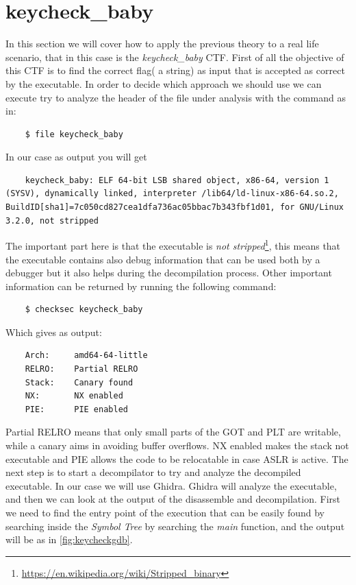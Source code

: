 \documentclass{article}
\begin{document}
\section{keycheck\_baby}
In this section we will cover how to apply the previous theory to a real life scenario, that in this case is the \textit{keycheck\_baby} CTF.
First of all the objective of this CTF is to find the correct flag( a string) as input that is accepted as correct by the executable.
In order to decide which approach we should use we can execute try to analyze the header of the file under analysis with the command as in:
\begin{verbatim}
    $ file keycheck_baby
\end{verbatim}
In our case as output you will get
\begin{verbatim}
    keycheck_baby: ELF 64-bit LSB shared object, x86-64, version 1 (SYSV), dynamically linked, interpreter /lib64/ld-linux-x86-64.so.2, BuildID[sha1]=7c050cd827cea1dfa736ac05bbac7b343fbf1d01, for GNU/Linux 3.2.0, not stripped
\end{verbatim}
The important part here is that the executable is \textit{not stripped}\footnote{\url{https://en.wikipedia.org/wiki/Stripped_binary}}, this means that the executable contains also debug information that can be used both by a debugger but it also helps during the decompilation process.
Other important information can be returned by running the following command:
\begin{verbatim}
    $ checksec keycheck_baby
\end{verbatim}
Which gives as output:
\begin{verbatim}
    Arch:     amd64-64-little
    RELRO:    Partial RELRO
    Stack:    Canary found
    NX:       NX enabled
    PIE:      PIE enabled
\end{verbatim}
Partial RELRO means that only small parts of the GOT and PLT are writable, while a canary aims in avoiding buffer overflows. NX enabled makes the stack not executable and PIE allows the code to be relocatable in case ASLR is active.
The next step is to start a decompilator to try and analyze the decompiled executable. In our case we will use Ghidra. Ghidra will analyze the executable, and then we can look at the output of the disassemble and decompilation.
First we need to find the entry point of the execution that can be easily found by searching inside the \textit{Symbol Tree} by searching the \textit{main} function, and the output will be as in \ref{fig:keycheckgdb}.
\end{document}

